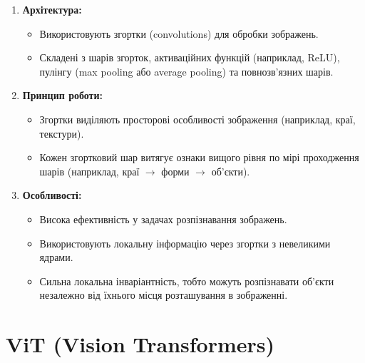 \documentclass{udstu}
\begin{document}
\begin{enumerate}
    \item \textbf{Архітектура:}
    \begin{itemize}
        \item Використовують згортки (convolutions) для обробки зображень.
        \item Складені з шарів згорток, активаційних функцій (наприклад, ReLU), пулінгу (max pooling або average pooling) та повнозв'язних шарів.
    \end{itemize}

    \item \textbf{Принцип роботи:}
    \begin{itemize}
        \item Згортки виділяють просторові особливості зображення (наприклад, краї, текстури).
        \item Кожен згортковий шар витягує ознаки вищого рівня по мірі проходження шарів (наприклад, краї $\rightarrow$ форми $\rightarrow$ об'єкти).
    \end{itemize}

    \item \textbf{Особливості:}
    \begin{itemize}
        \item Висока ефективність у задачах розпізнавання зображень.
        \item Використовують локальну інформацію через згортки з невеликими ядрами.
        \item Сильна локальна інваріантність, тобто можуть розпізнавати об'єкти незалежно від їхнього місця розташування в зображенні.
    \end{itemize}
\end{enumerate}

\section*{ViT (Vision Transformers)}
\end{document}
